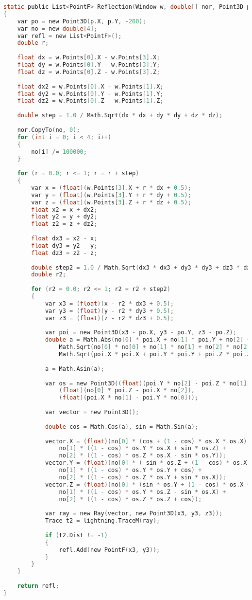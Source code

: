 \begin{lstlisting}[label=lst:raytrac,caption=Функция заполнения карты достоверности, language=c]
static public List<PointF> Reflection(Window w, double[] nor, Point3D p, Lightning lightning)
{
	var po = new Point3D(p.X, p.Y, -200);
	var no = new double[4];
	var refl = new List<PointF>();
	double r;
	
	float dx = w.Points[0].X - w.Points[3].X;
	float dy = w.Points[0].Y - w.Points[3].Y;
	float dz = w.Points[0].Z - w.Points[3].Z;
	
	float dx2 = w.Points[0].X - w.Points[1].X;
	float dy2 = w.Points[0].Y - w.Points[1].Y;
	float dz2 = w.Points[0].Z - w.Points[1].Z;
	
	double step = 1.0 / Math.Sqrt(dx * dx + dy * dy + dz * dz);
	
	nor.CopyTo(no, 0);
	for (int i = 0; i < 4; i++)
	{
		no[i] /= 100000;
	}
	
	for (r = 0.0; r <= 1; r = r + step)
	{
		var x = (float)(w.Points[3].X + r * dx + 0.5);
		var y = (float)(w.Points[3].Y + r * dy + 0.5);
		var z = (float)(w.Points[3].Z + r * dz + 0.5);
		float x2 = x + dx2;
		float y2 = y + dy2;
		float z2 = z + dz2;
		
		float dx3 = x2 - x;
		float dy3 = y2 - y;
		float dz3 = z2 - z;
		
		double step2 = 1.0 / Math.Sqrt(dx3 * dx3 + dy3 * dy3 + dz3 * dz3);
		double r2;
		
		for (r2 = 0.0; r2 <= 1; r2 = r2 + step2)
		{
			var x3 = (float)(x - r2 * dx3 + 0.5);
			var y3 = (float)(y - r2 * dy3 + 0.5);
			var z3 = (float)(z - r2 * dz3 + 0.5);
			
			var poi = new Point3D(x3 - po.X, y3 - po.Y, z3 - po.Z);
			double a = Math.Abs(no[0] * poi.X + no[1] * poi.Y + no[2] * poi.Z) /
				Math.Sqrt(no[0] * no[0] + no[1] * no[1] + no[2] * no[2]) /
				Math.Sqrt(poi.X * poi.X + poi.Y * poi.Y + poi.Z * poi.Z);
			
			a = Math.Asin(a);
			
			var os = new Point3D((float)(poi.Y * no[2] - poi.Z * no[1]),
				(float)(no[0] * poi.Z - poi.X * no[2]),
				(float)(poi.X * no[1] - poi.Y * no[0]));
			
			var vector = new Point3D();
			
			double cos = Math.Cos(a), sin = Math.Sin(a);
			
			vector.X = (float)(no[0] * (cos + (1 - cos) * os.X * os.X) + 
				no[1] * ((1 - cos) * os.Y * os.X + sin * os.Z) +
				no[2] * ((1 - cos) * os.Z * os.X - sin * os.Y));
			vector.Y = (float)(no[0] * (-sin * os.Z + (1 - cos) * os.X * os.Y) + 
				no[1] * ((1 - cos) * os.Y * os.Y + cos) +
				no[2] * ((1 - cos) * os.Z * os.Y + sin * os.X));
			vector.Z = (float)(no[0] * (sin * os.Y + (1 - cos) * os.X * os.Z) + 
				no[1] * ((1 - cos) * os.Y * os.Z - sin * os.X) +
				no[2] * ((1 - cos) * os.Z * os.Z + cos));
			
			var ray = new Ray(vector, new Point3D(x3, y3, z3));
			Trace t2 = lightning.TraceM(ray);
			
			if (t2.Dist != -1)
			{
				refl.Add(new PointF(x3, y3));
			}
		}
	}
	
	return refl;
}
\end{lstlisting}


